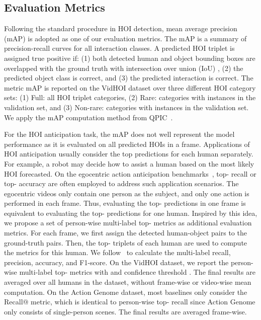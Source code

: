 \documentclass[times,twocolumn,final,authoryear]{elsarticle}
\begin{document}
\subsection{Evaluation Metrics}
Following the standard procedure in HOI detection, mean average precision (mAP) is adopted as one of our evaluation metrics. The mAP is a summary of precision-recall curves for all interaction classes. A predicted HOI triplet is assigned true positive if: (1) both detected human and object bounding boxes are overlapped with the ground truth with intersection over union (IoU) , (2) the predicted object class is correct, and (3) the predicted interaction is correct. The metric mAP is reported on the VidHOI dataset over three different HOI category sets: (1) Full: all  HOI triplet categories, (2) Rare:  categories with  instances in the validation set, and (3) Non-rare:  categories with  instances in the validation set. We apply the mAP computation method from QPIC~\citep{hoi_i1:qpic}.





For the HOI anticipation task, the mAP does not well represent the model performance as it is evaluated on all predicted HOIs in a frame. Applications of HOI anticipation usually consider the top predictions for each human separately. For example, a robot may decide how to assist a human based on the most likely HOI forecasted. On the egocentric action anticipation benchmarks~\citep{ego_set:epic100, ego_set:epic55, ego_set:egteagaze}, top- recall or top- accuracy are often employed to address such application scenarios. The egocentric videos only contain one person as the subject, and only one action is performed in each frame. Thus, evaluating the top- predictions in one frame is equivalent to evaluating the top- predictions for one human. Inspired by this idea, we propose a set of person-wise multi-label top- metrics as additional evaluation metrics. For each frame, we first assign the detected human-object pairs to the ground-truth pairs. Then, the top- triplets of each human are used to compute the metrics for this human. We follow~\citep{metric:multi_label} to calculate the multi-label recall, precision, accuracy, and F1-score. On the VidHOI dataset, we report the person-wise multi-label top- metrics with  and confidence threshold . The final results are averaged over all humans in the dataset, without frame-wise or video-wise mean computation. On the Action Genome dataset, most baselines only consider the Recall@ metric, which is identical to person-wise top- recall since Action Genome only consists of single-person scenes. The final results are averaged frame-wise. 
\end{document}
